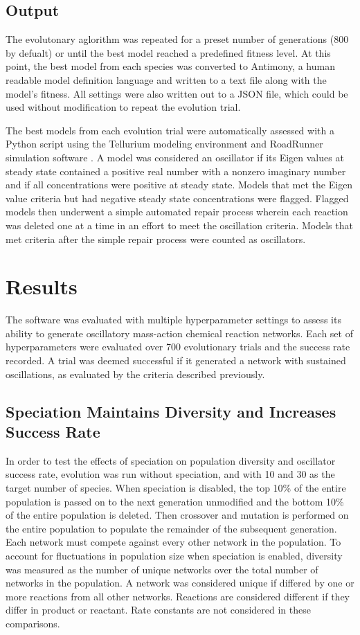 \documentclass[12pt]{report}
\begin{document}
\subsection{Output}
The evolutonary aglorithm was repeated for a preset number of generations (800 by defualt) or until the best model reached a predefined fitness level. At this point, the best model from each species was converted to Antimony, a human readable model definition language \cite{Smith2009} and written to a text file along with the model's fitness. All settings were also written out to a JSON file, which could be used without modification to repeat the evolution trial.

The best models from each evolution trial were automatically assessed with a Python script using the Tellurium modeling environment \cite{Choi2018} and RoadRunner simulation software \cite{andy2020}. A model was considered an oscillator if its Eigen values at steady state contained a positive real number with a nonzero imaginary number and if all concentrations were positive at steady state. Models that met the Eigen value criteria but had negative steady state concentrations were flagged. Flagged models then underwent a simple automated repair process wherein each reaction was deleted one at a time in an effort to meet the oscillation criteria. Models that met criteria after the simple repair process were counted as oscillators.

\section{Results}
The software was evaluated with multiple hyperparameter settings to assess its ability to generate oscillatory mass-action chemical reaction networks. Each set of hyperparameters were evaluated over 700 evolutionary trials and the success rate recorded. A trial was deemed successful if it generated a network with sustained oscillations, as evaluated by the criteria described previously.

\subsection{Speciation Maintains Diversity and Increases Success Rate}
In order to test the effects of speciation on population diversity and oscillator success rate, evolution was run without speciation, and with 10 and 30 as the target number of species. When speciation is disabled, the top 10\% of the entire population is passed on to the next generation unmodified and the bottom 10\% of the entire population is deleted. Then crossover and mutation is performed on the entire population to populate the remainder of the subsequent generation. Each network must compete against every other network in the population. To account for fluctuations in population size when speciation is enabled, diversity was measured as the number of unique networks over the total number of networks in the population. A network was considered unique if differed by one or more reactions from all other networks. Reactions are considered different if they differ in product or reactant. Rate constants are not considered in these comparisons. 
\end{document}
